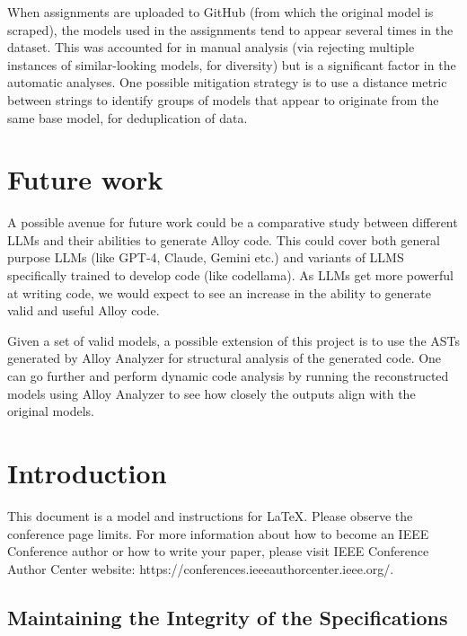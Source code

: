 \documentclass[conference]{IEEEtran}
\begin{document}
When assignments are uploaded to GitHub (from which the original model is scraped), the models used in the assignments tend to appear several times in the dataset. This was accounted for in manual analysis (via rejecting multiple instances of similar-looking models, for diversity) but is a significant factor in the automatic analyses. One possible mitigation strategy is to use a distance metric between strings to identify groups of models that appear to originate from the same base model, for deduplication of data.

\section{Future work}

A possible avenue for future work could be a comparative study between different LLMs and their abilities to generate Alloy code. This could cover both general purpose LLMs (like GPT-4, Claude, Gemini etc.) and variants of LLMS specifically trained to develop code (like codellama). As LLMs get more powerful at writing code, we would expect to see an increase in the ability to generate valid and useful Alloy code.

Given a set of valid models, a possible extension of this project is to use the ASTs generated by Alloy Analyzer for structural analysis of the generated code. One can go further and perform dynamic code analysis by running the reconstructed models using Alloy Analyzer to see how closely the outputs align with the original models.

\subsection{}

\section{Introduction}
This document is a model and instructions for \LaTeX.
Please observe the conference page limits. For more information about how to become an IEEE Conference author or how to write your paper, please visit   IEEE Conference Author Center website: https://conferences.ieeeauthorcenter.ieee.org/.

\subsection{Maintaining the Integrity of the Specifications}
\end{document}
